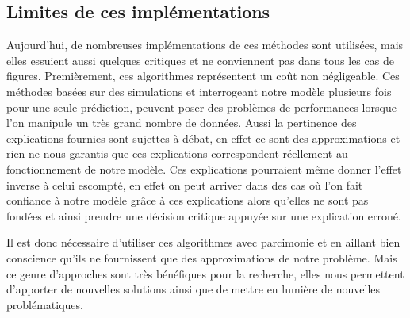 \subsection{Limites de ces implémentations}
Aujourd'hui, de nombreuses implémentations de ces méthodes sont utilisées, mais elles essuient aussi quelques critiques et ne conviennent pas dans tous les cas de figures. Premièrement, ces algorithmes représentent un coût non négligeable. Ces méthodes basées sur des simulations et interrogeant notre modèle plusieurs fois pour une seule prédiction, peuvent poser des problèmes de performances lorsque l'on manipule un très grand nombre de données. Aussi la pertinence des explications fournies sont sujettes à débat, en effet ce sont des approximations et rien ne nous garantis que ces explications correspondent réellement au fonctionnement de notre modèle. Ces explications pourraient même donner l'effet inverse à celui escompté, en effet on peut arriver dans des cas où l'on fait confiance à notre modèle grâce à ces explications alors qu'elles ne sont pas fondées et ainsi prendre une décision critique appuyée sur une explication erroné.\par

Il est donc nécessaire d'utiliser ces algorithmes avec parcimonie et en aillant bien conscience qu'ils ne fournissent que des approximations de notre problème. Mais ce genre d'approches sont très bénéfiques pour la recherche, elles nous permettent d'apporter de nouvelles solutions ainsi que de mettre en lumière de nouvelles problématiques.
